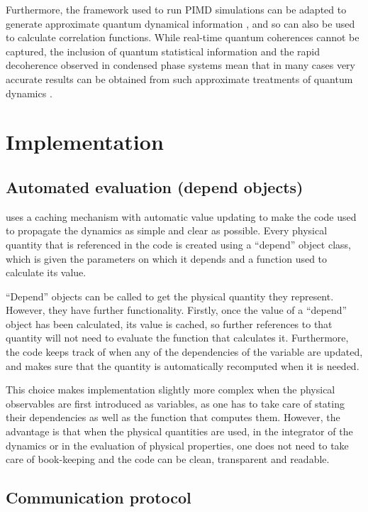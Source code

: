 \documentclass[11pt,english,fleqn]{report}
\begin{document}
Furthermore, the framework used to run PIMD simulations can be adapted
to generate approximate quantum dynamical information 
\cite{cao-voth93jcp,cao-voth94jcp,crai-mano04jcp,braa-mano06jcp},
and so can also be used to calculate correlation functions. While
real-time quantum coherences cannot be captured, the inclusion 
of quantum statistical information
and the rapid decoherence observed in condensed phase systems mean
that in many cases very accurate results can be obtained from such
approximate treatments of quantum dynamics \cite{habe+13arpc}.


\section{Implementation}


\subsection{Automated evaluation (depend objects)}

\ipi uses a caching mechanism with automatic value updating to make
the code used to propagate the dynamics as simple and clear as possible.
Every physical quantity that is referenced in the code is created
using a {}``depend'' object class, which is given the parameters
on which it depends and a function used to calculate its value. 

{}``Depend'' objects can be called to get the physical quantity
they represent. However, they have further functionality. Firstly,
once the value of a {}``depend'' object has been calculated, its
value is cached, so further references to that quantity will not need
to evaluate the function that calculates it. Furthermore, the code
keeps track of when any of the dependencies of the variable are updated,
and makes sure that the quantity is automatically recomputed when
it is needed. 

This choice makes implementation slightly more complex when the physical
observables are first introduced as variables, as one has to take
care of stating their dependencies as well as the function that computes
them. However, the advantage is that when the physical quantities
are used, in the integrator of the dynamics or in the evaluation of
physical properties, one does not need to take care of book-keeping
and the code can be clean, transparent and readable.


\subsection{Communication protocol}
\end{document}
